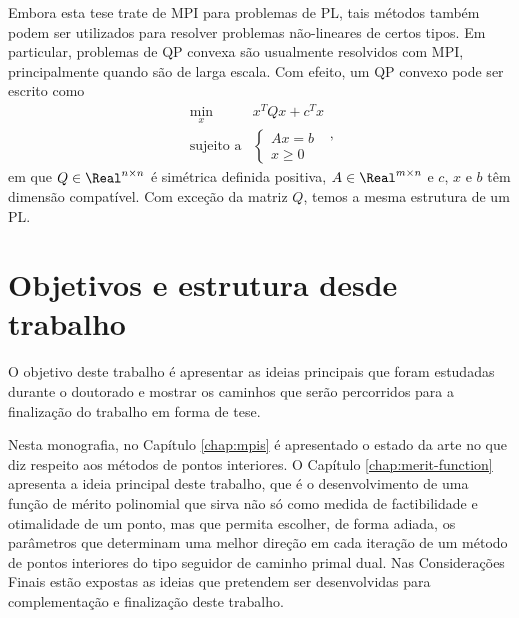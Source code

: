   

Embora esta tese trate de \ac{MPI} para problemas de \ac{PL}, tais
métodos também podem ser utilizados para resolver problemas não-lineares
de certos tipos.
Em particular, problemas de  \ac{QP} convexa
são usualmente resolvidos com \ac{MPI}, principalmente
quando são de larga escala. Com efeito, um \ac{QP} convexo pode ser  escrito como
\begin{equation*}
	\begin{array}{lc}
\displaystyle \min_{x} & x^TQx + c^Tx \\
\text{sujeito a} &\begin{cases} Ax = b \\
				 x \geq 0	
				 \end{cases}
\end{array},
\label{eq:QP}
\end{equation*}
em que $Q\in\Real^{n\times n}$ é simétrica definida positiva, $A\in \Real^{m\times
n}$ e $c$, $x$ e $b$ têm dimensão compatível. Com exceção da matriz $Q$, temos a
mesma estrutura de um \ac{PL}.


\section{Objetivos e estrutura desde trabalho}

O objetivo deste trabalho é apresentar as ideias principais que foram estudadas
durante o doutorado e mostrar os caminhos que serão percorridos para a
finalização do trabalho em forma de tese.

Nesta monografia, no Capítulo \ref{chap:mpis} é apresentado o estado da arte no
que diz respeito aos métodos de pontos interiores. O Capítulo
\ref{chap:merit-function} apresenta a ideia principal deste trabalho, que é o
desenvolvimento de uma função de mérito polinomial que sirva não só como medida
de factibilidade e otimalidade de um ponto, mas que permita escolher, de forma
adiada, os parâmetros que determinam uma melhor direção em cada iteração
de um método de pontos interiores do tipo seguidor de caminho primal dual. Nas
Considerações Finais estão expostas as ideias que pretendem ser
desenvolvidas para complementação e finalização deste trabalho.
